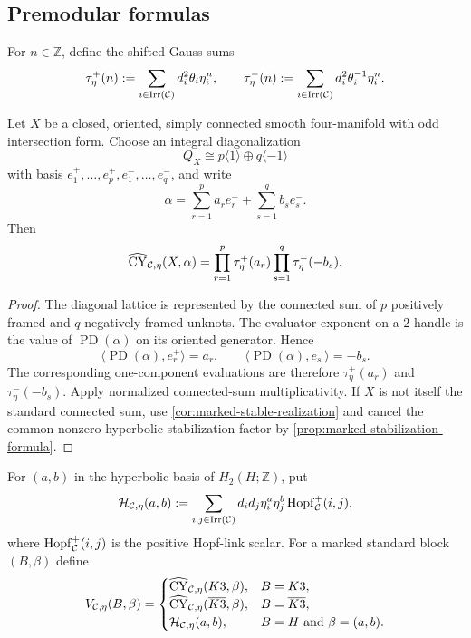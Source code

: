 \subsection{Premodular formulas}
\label{subsec:premodular-formulas}

For $n\in\mathbb Z$, define the shifted Gauss sums
\[
  \tau_\eta^+(n)
  :=\sum_{i\in\operatorname{Irr}(\mathcal{C})}d_i^2\theta_i\eta_i^n,
  \qquad
  \tau_\eta^-(n)
  :=\sum_{i\in\operatorname{Irr}(\mathcal{C})}d_i^2\theta_i^{-1}\eta_i^n.
\]

\begin{proposition}
\label{prop:odd-formula}
Let $X$ be a closed, oriented, simply connected smooth four-manifold with
odd intersection form.  Choose an integral diagonalization
\[
  Q_X\cong p\langle1\rangle\oplus q\langle-1\rangle
\]
with basis $e_1^+,\ldots,e_p^+,e_1^-,\ldots,e_q^-$, and write
\[
  \alpha=\sum_{r=1}^p a_re_r^++\sum_{s=1}^q b_se_s^-.
\]
Then
\[
  \widehat{\operatorname{CY}}_{\mathcal{C},\eta}(X,\alpha)
  =\prod_{r=1}^{p}\tau_\eta^+(a_r)
   \prod_{s=1}^{q}\tau_\eta^-(-b_s).
\]
\end{proposition}

\begin{proof}
The diagonal lattice is represented by the connected sum of $p$ positively
framed and $q$ negatively framed unknots.  The evaluator exponent on a
$2$-handle is the value of $\operatorname{PD}(\alpha)$ on its oriented
generator.  Hence
\[
  \langle\operatorname{PD}(\alpha),e_r^+\rangle=a_r,
  \qquad
  \langle\operatorname{PD}(\alpha),e_s^-\rangle=-b_s.
\]
The corresponding one-component evaluations are therefore
$\tau_\eta^+(a_r)$ and $\tau_\eta^-(-b_s)$.  Apply normalized connected-sum
multiplicativity.  If $X$ is not itself the standard connected sum, use
\cref{cor:marked-stable-realization} and cancel the common nonzero
hyperbolic stabilization factor by
\cref{prop:marked-stabilization-formula}.
\end{proof}

For $(a,b)$ in the hyperbolic basis of $H_2(H;\mathbb Z)$, put
\[
  \mathcal H_{\mathcal{C},\eta}(a,b)
  :=\sum_{i,j\in\operatorname{Irr}(\mathcal{C})}
       d_i d_j\eta_i^a\eta_j^b
       \operatorname{Hopf}_{\mathcal{C}}^{+}(i,j),
\]
where $\operatorname{Hopf}_{\mathcal{C}}^{+}(i,j)$ is the positive Hopf-link
scalar.  For a marked standard block $(B,\beta)$ define
\[
  V_{\mathcal{C},\eta}(B,\beta)=
  \begin{cases}
    \widehat{\operatorname{CY}}_{\mathcal{C},\eta}(K3,\beta),&B=K3,\\
    \widehat{\operatorname{CY}}_{\mathcal{C},\eta}(\overline{K3},\beta),
      &B=\overline{K3},\\
    \mathcal H_{\mathcal{C},\eta}(a,b),
      &B=H\text{ and }\beta=(a,b).
  \end{cases}
\]

